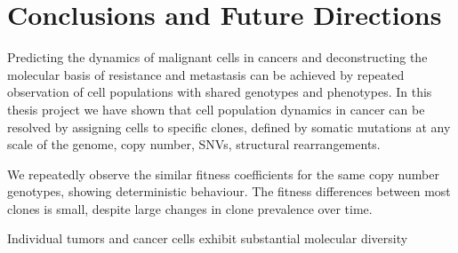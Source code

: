 
{\chapter{Conclusions and Future Directions}

}
\label{ch:Chapter6}
Predicting the dynamics of malignant cells in cancers and deconstructing the molecular basis of resistance and metastasis can be achieved by repeated observation of cell populations with shared genotypes and phenotypes. In this thesis project we have shown that cell population dynamics in cancer can be resolved by assigning cells to specific clones, defined by somatic mutations at any scale of the genome, copy number, SNVs, structural rearrangements. 

We repeatedly observe the similar fitness coefficients for the same copy number genotypes, showing deterministic behaviour. The fitness differences between most clones is small, despite large changes in clone prevalence over time.






Individual tumors and cancer cells exhibit substantial molecular diversity
